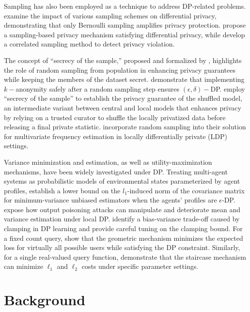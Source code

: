 \documentclass{article}
\theoremstyle{definition}
\begin{document}
Sampling has also been employed as a technique to address DP-related problems. \citet{ebadi2016sampling} examine the impact of various sampling schemes on differential privacy, demonstrating that only Bernoulli sampling amplifies privacy protection. \citet{joy2017differential} propose a sampling-based privacy mechanism satisfying differential privacy, while \citet{bichsel2018finder} develop a correlated sampling method to detect privacy violation. 

The concept of ``secrecy of the sample,'' proposed and formalized by \citet{kasiviswanathan2011can}, highlights the role of random sampling from population in enhancing privacy guarantees while keeping the members of the dataset secret. \citet{li2012sampling} demonstrate that implementing $k-$anonymity safely after a random sampling step ensures $(\epsilon,\delta)-$DP. \citet{cheu2019distributed} employ ``secrecy of the sample'' to establish the privacy guarantee of the shuffled model, an intermediate variant between central and local models that enhances privacy by relying on a trusted curator to shuffle the locally privatized data before releasing a final private statistic. \citet{heber2021random} incorporate random sampling into their solution for multivariate frequency estimation in locally differentially private (LDP) settings.

Variance minimization and estimation, as well as utility-maximization mechanisms, have been widely investigated under DP. Treating multi-agent systems as probabilistic models of environmental states parameterized by agent profiles, \citet{wang2017dpminvariance} establish a lower bound on the $l_1$-induced norm of the covariance matrix for minimum-variance unbiased estimators when the agents’ profiles are $\epsilon$-DP. \citet{li2023fine} expose how output poisoning attacks can manipulate and deteriorate mean and variance estimation under local DP. \citet{amin2019bounding} identify a bias-variance trade-off caused by clamping in DP learning and provide careful tuning on the clamping bound. For a fixed count query, \citet{ghosh2009universally} show that the geometric mechanism minimizes the expected loss for virtually all possible users while satisfying the DP constraint. Similarly, for a single real-valued query function, \citet{geng2015optimal} demonstrate that the staircase mechanism can minimize $\ell_1$ and $\ell_2$ costs under specific parameter settings.


\section{Background} \label{sec: Background}
\end{document}
